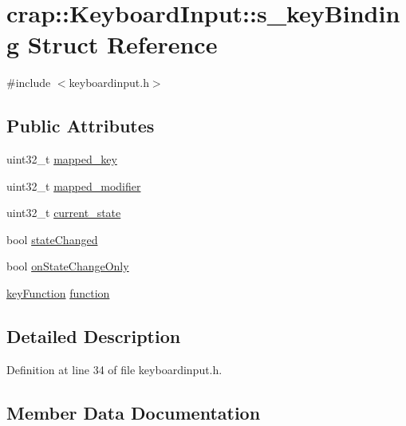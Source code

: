 \hypertarget{structcrap_1_1_keyboard_input_1_1s__key_binding}{}\section{crap\+:\+:Keyboard\+Input\+:\+:s\+\_\+key\+Binding Struct Reference}
\label{structcrap_1_1_keyboard_input_1_1s__key_binding}


{\ttfamily \#include $<$keyboardinput.\+h$>$}

\subsection*{Public Attributes}
\begin{DoxyCompactItemize}
\item 
uint32\+\_\+t \hyperlink{structcrap_1_1_keyboard_input_1_1s__key_binding_a7db8edac7a98cc852bf3a5dfa0fe8f08}{mapped\+\_\+key}
\item 
uint32\+\_\+t \hyperlink{structcrap_1_1_keyboard_input_1_1s__key_binding_aa0b547245a3a8a5ac28e5fb7b9321725}{mapped\+\_\+modifier}
\item 
uint32\+\_\+t \hyperlink{structcrap_1_1_keyboard_input_1_1s__key_binding_a61b968c561b8c38e6f2d3915cdec8d9e}{current\+\_\+state}
\item 
bool \hyperlink{structcrap_1_1_keyboard_input_1_1s__key_binding_ab4b86f691dfdf3489100a88fc4bd4128}{state\+Changed}
\item 
bool \hyperlink{structcrap_1_1_keyboard_input_1_1s__key_binding_a4881e319b63069077197ed28b2b2ce23}{on\+State\+Change\+Only}
\item 
\hyperlink{classcrap_1_1_keyboard_input_a65627167afa075a37fa85b21b5e9fb0b}{key\+Function} \hyperlink{structcrap_1_1_keyboard_input_1_1s__key_binding_acf149623f1efc9e7cf13e2162db08862}{function}
\end{DoxyCompactItemize}


\subsection{Detailed Description}


Definition at line 34 of file keyboardinput.\+h.



\subsection{Member Data Documentation}
\hypertarget{structcrap_1_1_keyboard_input_1_1s__key_binding_a61b968c561b8c38e6f2d3915cdec8d9e}{}
